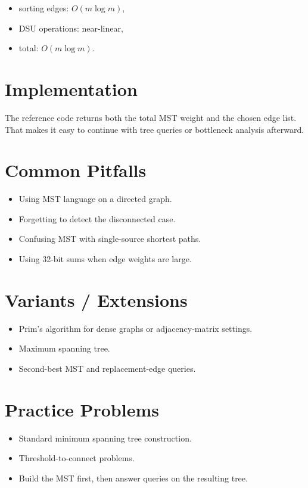 \begin{itemize}
  \item sorting edges: \(O(m \log m)\),
  \item DSU operations: near-linear,
  \item total: \(O(m \log m)\).
\end{itemize}

\section*{Implementation}

The reference code returns both the total MST weight and the chosen edge list. That makes it easy to continue with tree
queries or bottleneck analysis afterward.

\section*{Common Pitfalls}

\begin{itemize}
  \item Using MST language on a directed graph.
  \item Forgetting to detect the disconnected case.
  \item Confusing MST with single-source shortest paths.
  \item Using 32-bit sums when edge weights are large.
\end{itemize}

\section*{Variants / Extensions}

\begin{itemize}
  \item Prim's algorithm for dense graphs or adjacency-matrix settings.
  \item Maximum spanning tree.
  \item Second-best MST and replacement-edge queries.
\end{itemize}

\section*{Practice Problems}

\begin{itemize}
  \item Standard minimum spanning tree construction.
  \item Threshold-to-connect problems.
  \item Build the MST first, then answer queries on the resulting tree.
\end{itemize}

